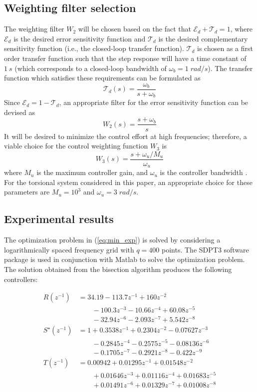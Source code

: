 \documentclass[a4paper, 10pt, conference]{ieeeconf}
\begin{document}
\subsection{Weighting filter selection}
The weighting filter $W_2$ will be chosen based on the fact that $\mathcal{E}_d + \mathcal{T}_d = 1$, where $\mathcal{E}_d$ is the desired error sensitivity function and $\mathcal{T}_d$ is the desired complementary sensitivity function (i.e., the closed-loop transfer function). $\mathcal{T}_d$ is chosen as a first order transfer function such that the step response will have a time constant of $1 \: s$ (which corresponds to a closed-loop bandwidth of $\omega_b = 1 \; rad/s$). The transfer function which satisfies these requirements can be formulated as
\begin{equation}
\mathcal{T}_d(s) = \frac{\omega_b}{s+\omega_b}
\end{equation}
Since $\mathcal{E}_d  = 1- \mathcal{T}_d$, an appropriate filter for the error sensitivity function can be devised as
\begin{equation}
W_2(s) = \frac{s+\omega_b}{s}
\end{equation}
It will be desired to minimize the control effort at high frequencies; therefore, a viable choice for the control weighting function $W_3$ is
\begin{equation}
W_3(s) = \frac{s + \omega_u / M_u}{\omega_u}
\end{equation}
where $M_u$ is the maximum controller gain, and $\omega_u$ is the controller bandwidth \cite{ZD98}. For the torsional system considered in this paper, an appropriate choice for these parameters are $M_u = 10^3$ and $\omega_u = 3 \; rad/s$. 
\subsection{Experimental results}
The optimization problem in (\ref{eq:min_exp}) is solved by considering a logarithmically spaced frequency grid with $q = 400$ points. The SDPT3 software package is used in conjunction with Matlab to solve the optimization problem. The solution obtained from the bisection algorithm produces the following controllers:

\begin{align*}
R(z^{-1}) &= 34.19 - 113.7 z^{-1} + 160  z^{-2} \\ &\qquad - 100.3 z^{-3} - 10.66 z^{-4} + 60.08 z^{-5} \\ &\qquad - 32.94 z^{-6} - 2.093 z^{-7} + 5.542 z^{-8}  \\
S^{\star}(z^{-1}) &=  1 + 0.3538 z^{-1} + 0.2304 z^{-2} - 0.07627 z^{-3} \\ &\qquad - 0.2845 z^{-4} - 0.2575 z^{-5} - 0.08136 z^{-6} \\ &\qquad - 0.1705 z^{-7} - 0.2921 z^{-8} - 0.422 z^{-9}\\
T(z^{-1}) &= 0.00942 + 0.01295 z^{-1} + 0.01548 z^{-2} \\ &\qquad + 0.01646  z^{-3} + 0.01116 z^{-4} + 0.01683 z^{-5} \\ &\qquad + 0.01491 z^{-6}  + 0.01329 z^{-7} + 0.01008 z^{-8}
\end{align*}
\end{document}
